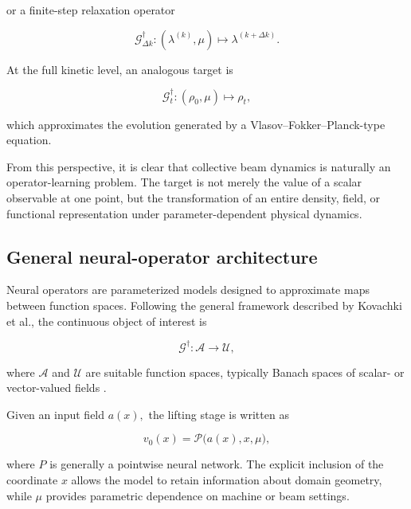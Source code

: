 or a finite-step relaxation operator

\begin{equation}
\label{eq:77}
\mathcal G_{\Delta k}^{\dagger}:(\lambda^{(k)},\mu)\longmapsto\lambda^{(k+\Delta k)}.
\end{equation}

At the full kinetic level, an analogous target is

\begin{equation}
\label{eq:78}
\mathcal G_t^{\dagger}:(\rho_0,\mu)\longmapsto\rho_t,
\end{equation}

which approximates the evolution generated by a Vlasov–Fokker–Planck-type equation.

From this perspective, it is clear that collective beam dynamics is naturally an operator-learning problem. The target is not merely the value of a scalar observable at one point, but the transformation of an entire density, field, or functional representation under parameter-dependent physical dynamics.

\subsection{General neural-operator architecture}
\label{sec:04_machine_learning_methodology_general_neural_operator_architecture}

Neural operators are parameterized models designed to approximate maps between function spaces. Following the general framework described by Kovachki et al.\cite{kovachki2023operators}, the continuous object of interest is

\begin{equation}
\label{eq:79}
\mathcal G^{\dagger}:\mathcal A\longrightarrow\mathcal U,
\end{equation}

where \(\mathcal{A}\) and \(\mathcal{U}\) are suitable function spaces, typically Banach spaces of scalar- or vector-valued fields \cite{kovachki2023operators}.

Given an input field \(a ( x ) ,\) the lifting stage is written as

\begin{equation}
\label{eq:80}
v_0(x)=\mathcal P\bigl(a(x),x,\mu\bigr),
\end{equation}

where \(P\) is generally a pointwise neural network. The explicit inclusion of the coordinate \(x\) allows the model to retain information about domain geometry, while \(\mu\) provides parametric dependence on machine or beam settings.

